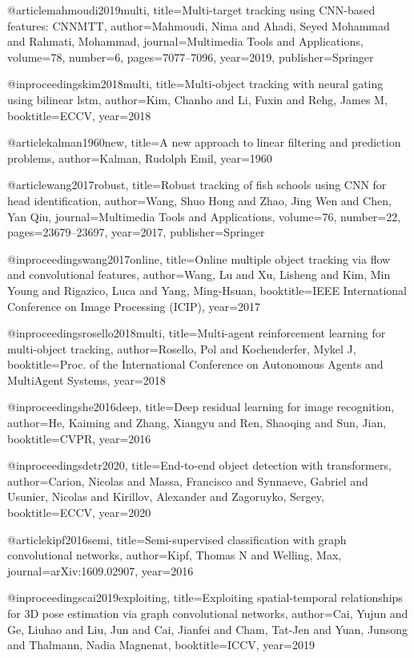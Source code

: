 @article{mahmoudi2019multi,
  title={Multi-target tracking using CNN-based features: {CNNMTT}},
  author={Mahmoudi, Nima and Ahadi, Seyed Mohammad and Rahmati, Mohammad},
  journal={Multimedia Tools and Applications},
  volume={78},
  number={6},
  pages={7077--7096},
  year={2019},
  publisher={Springer}
}

@inproceedings{kim2018multi,
  title={Multi-object tracking with neural gating using bilinear lstm},
  author={Kim, Chanho and Li, Fuxin and Rehg, James M},
  booktitle=ECCV,
  year={2018}
}

@article{kalman1960new,
  title={A new approach to linear filtering and prediction problems},
  author={Kalman, Rudolph Emil},
  year={1960}
}

@article{wang2017robust,
  title={Robust tracking of fish schools using CNN for head identification},
  author={Wang, Shuo Hong and Zhao, Jing Wen and Chen, Yan Qiu},
  journal={Multimedia Tools and Applications},
  volume={76},
  number={22},
  pages={23679--23697},
  year={2017},
  publisher={Springer}
}

@inproceedings{wang2017online,
  title={Online multiple object tracking via flow and convolutional features},
  author={Wang, Lu and Xu, Lisheng and Kim, Min Young and Rigazico, Luca and Yang, Ming-Hsuan},
  booktitle={IEEE International Conference on Image Processing (ICIP)},
  year={2017}
}

@inproceedings{rosello2018multi,
  title={Multi-agent reinforcement learning for multi-object tracking},
  author={Rosello, Pol and Kochenderfer, Mykel J},
  booktitle={Proc. of the International Conference on Autonomous Agents and MultiAgent Systems},
  year={2018}
}

@inproceedings{he2016deep,
  title={Deep residual learning for image recognition},
  author={He, Kaiming and Zhang, Xiangyu and Ren, Shaoqing and Sun, Jian},
  booktitle=CVPR,
  year={2016}
}

@inproceedings{detr2020,
  title={End-to-end object detection with transformers},
  author={Carion, Nicolas and Massa, Francisco and Synnaeve, Gabriel and Usunier, Nicolas and Kirillov, Alexander and Zagoruyko, Sergey},
  booktitle=ECCV,
  year={2020}
}

@article{kipf2016semi,
  title={Semi-supervised classification with graph convolutional networks},
  author={Kipf, Thomas N and Welling, Max},
  journal={arXiv:1609.02907},
  year={2016}
}

@inproceedings{cai2019exploiting,
  title={Exploiting spatial-temporal relationships for {3D} pose estimation via graph convolutional networks},
  author={Cai, Yujun and Ge, Liuhao and Liu, Jun and Cai, Jianfei and Cham, Tat-Jen and Yuan, Junsong and Thalmann, Nadia Magnenat},
  booktitle=ICCV,
  year={2019}
}

